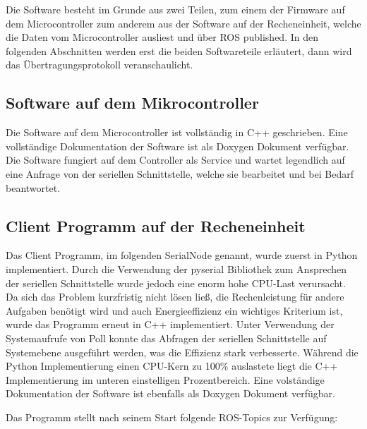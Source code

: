 Die Software besteht im Grunde aus zwei Teilen, zum einem der Firmware auf dem Microcontroller zum anderem aus der Software auf der Recheneinheit, welche die Daten vom Microcontroller ausliest und über ROS published.
In den folgenden Abschnitten werden erst die beiden Softwareteile erläutert, dann wird das Übertragungsprotokoll veranschaulicht.


\subsection{Software auf dem Mikrocontroller}
Die Software auf dem Microcontroller ist vollständig in C++ geschrieben. Eine vollständige Dokumentation der Software ist als Doxygen Dokument verfügbar. 
Die Software fungiert auf dem Controller als Service und wartet legendlich auf eine Anfrage von der seriellen Schnittstelle, welche sie bearbeitet und bei Bedarf beantwortet. 


\subsection{Client Programm auf der Recheneinheit}
Das Client Programm, im folgenden SerialNode genannt, wurde zuerst in Python implementiert. Durch die Verwendung der pyserial Bibliothek zum Ansprechen der seriellen Schnittstelle wurde jedoch
eine enorm hohe CPU-Last verursacht. Da sich das Problem kurzfristig nicht lösen ließ, die Rechenleistung für andere Aufgaben benötigt wird und auch Energieeffizienz ein wichtiges Kriterium ist,
wurde das Programm erneut in C++ implementiert. Unter Verwendung der Systemaufrufe von Poll konnte das Abfragen der seriellen Schnittstelle auf Systemebene ausgeführt werden, was die Effizienz stark 
verbesserte. Während die Python Implementierung einen CPU-Kern zu 100\% auslastete liegt die C++ Implementierung im unteren einstelligen Prozentbereich.
Eine volständige Dokumentation der Software ist ebenfalls als Doxygen Dokument verfügbar.

Das Programm stellt nach seinem Start folgende ROS-Topics zur Verfügung:\\
 
